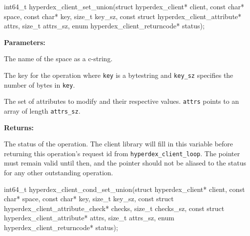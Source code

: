 \funcsep
\begin{ccode}
int64_t hyperdex_client_set_union(struct hyperdex_client* client,
                const char* space,
                const char* key, size_t key_sz,
                const struct hyperdex_client_attribute* attrs, size_t attrs_sz,
                enum hyperdex_client_returncode* status);
\end{ccode}
\funcdesc 

\noindent\textbf{Parameters:}
\begin{description}[labelindent=\widthof{{\texttt{attrs}, \texttt{attrs\_sz}}},leftmargin=*,noitemsep,nolistsep,align=right]
\item[\texttt{space}] The name of the space as a c-string.
\item[\texttt{key}, \texttt{key\_sz}] The key for the operation where \texttt{key} is a bytestring and \texttt{key\_sz} specifies the number of bytes in \texttt{key}.
\item[\texttt{attrs}, \texttt{attrs\_sz}] The set of attributes to modify and their respective values.  \texttt{attrs} points to an array of length \texttt{attrs\_sz}.
\end{description}

\noindent\textbf{Returns:}
\begin{description}[labelindent=\widthof{{\texttt{status}}},leftmargin=*,noitemsep,nolistsep,align=right]
\item[\texttt{status}] The status of the operation.  The client library will fill in this variable before returning this operation's request id from \texttt{hyperdex\_client\_loop}.  The pointer must remain valid until then, and the pointer should not be aliased to the status for any other outstanding operation.
\end{description}

\funcsep
\begin{ccode}
int64_t hyperdex_client_cond_set_union(struct hyperdex_client* client,
                const char* space,
                const char* key, size_t key_sz,
                const struct hyperdex_client_attribute_check* checks, size_t checks_sz,
                const struct hyperdex_client_attribute* attrs, size_t attrs_sz,
                enum hyperdex_client_returncode* status);
\end{ccode}
\funcdesc 

